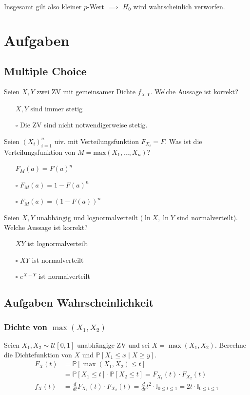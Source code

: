 \documentclass[a4paper,10pt]{article}
\def\P{\mathbb{P}}
\begin{document}
Insgesamt gilt also kleiner $p$-Wert $\implies$ $H_0$ wird wahrscheinlich verworfen.

\section{Aufgaben}
\subsection{Multiple Choice}

Seien \(X,Y\) zwei ZV mit gemeinsamer Dichte \(f_{X,Y}\). Welche Aussage ist korrekt?
\begin{itemize}
	\item[\checkmark] \(X,Y\) sind immer stetig
	\item[\(\square\)] Die ZV sind nicht notwendigerweise stetig.
\end{itemize}

\noindent
Seien \((X_i)_{i = 1}^n\) uiv. mit Verteilungsfunktion \(F_{X_i} = F\). Was ist die Verteilungsfunktion von \(M = \text{max}(X_1,...,X_n)\)?
\begin{itemize}
	\item[\checkmark] \(F_M(a) = F(a)^n\)
	\item[\(\square\)] \(F_M(a) = 1 - F(a)^n\)
	\item[\(\square\)] \(F_M(a) = (1 - F(a))^n\)
\end{itemize}

\noindent
Seien \(X, Y\) unabhängig und lognormalverteilt (\(\ln X, \ln Y\) sind normalverteilt). Welche Aussage ist korrekt?
\begin{itemize}
	\item[\checkmark] \(XY\) ist lognormalverteilt
	\item[\(\square\)] \(XY\) ist normalverteilt
	\item[\(\square\)] \(e^{X + Y}\) ist normalverteilt
\end{itemize}

\subsection{Aufgaben Wahrscheinlichkeit}
\subsubsection*{\texorpdfstring{Dichte von \(\max(X_1,X_2)\)}{Dichte von max()}}

Seien \(X_1, X_2 \sim \mathcal{U}[0,1]\) unabhängige ZV und sei \(X = \max (X_1, X_2)\). Berechne die Dichtefunktion von \(X\) und \(\P[X_1 \leq x \mid X \geq y]\).
\begin{align*}
	F_X(t) & = \P[\max(X_1, X_2) \leq t]                                                                                                              \\ &= \P[X_1 \leq t] \cdot \P[X_2 \leq t] = F_{X_1}(t) \cdot F_{X_2}(t) \\
	f_X(t) & = \frac{d}{dt} F_{X_1}(t) \cdot F_{X_2}(t) = \frac{d}{dt} t^2 \cdot \mathbb{I}_{0 \leq t \leq 1} = 2t \cdot \mathbb{I}_{0 \leq t \leq 1}
\end{align*}
\end{document}
